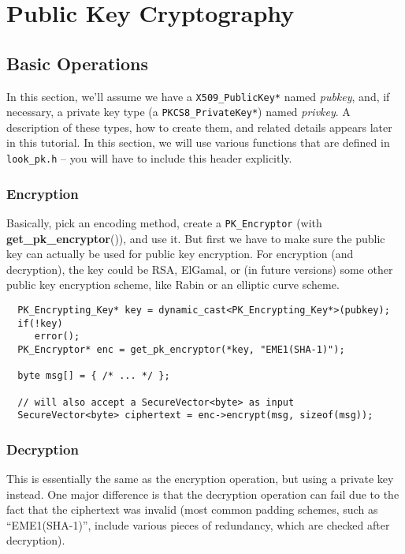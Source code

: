 \documentclass{article}
\newcommand{\filename}[1]{\texttt{#1}}
\newcommand{\function}[1]{\textbf{#1}}
\newcommand{\type}[1]{\texttt{#1}}
\renewcommand{\arg}[1]{\textsl{#1}}
\begin{document}
\pagebreak

\section{Public Key Cryptography}

\subsection{Basic Operations}

In this section, we'll assume we have a \type{X509\_PublicKey*} named
\arg{pubkey}, and, if necessary, a private key type (a
\type{PKCS8\_PrivateKey*}) named \arg{privkey}. A description of these types,
how to create them, and related details appears later in this tutorial. In this
section, we will use various functions that are defined in
\filename{look\_pk.h} -- you will have to include this header explicitly.

\subsubsection{Encryption}

Basically, pick an encoding method, create a \type{PK\_Encryptor} (with
\function{get\_pk\_encryptor}()), and use it. But first we have to make sure
the public key can actually be used for public key encryption. For encryption
(and decryption), the key could be RSA, ElGamal, or (in future versions) some
other public key encryption scheme, like Rabin or an elliptic curve scheme.

\begin{verbatim}
  PK_Encrypting_Key* key = dynamic_cast<PK_Encrypting_Key*>(pubkey);
  if(!key)
     error();
  PK_Encryptor* enc = get_pk_encryptor(*key, "EME1(SHA-1)");

  byte msg[] = { /* ... */ };

  // will also accept a SecureVector<byte> as input
  SecureVector<byte> ciphertext = enc->encrypt(msg, sizeof(msg));
\end{verbatim}

\subsubsection{Decryption}

This is essentially the same as the encryption operation, but using a private
key instead. One major difference is that the decryption operation can fail due
to the fact that the ciphertext was invalid (most common padding schemes, such
as ``EME1(SHA-1)'', include various pieces of redundancy, which are checked
after decryption).
\end{document}
